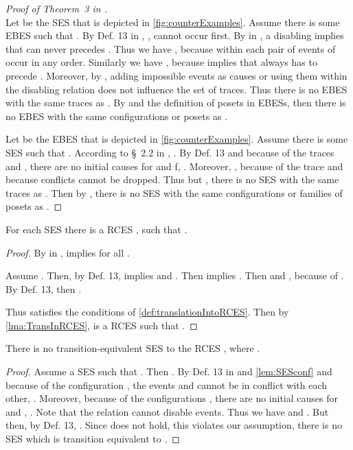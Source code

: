\documentclass[runningheads,a4paper]{llncs}
\begin{document}
\begin{proof}[Proof of Theorem~3 in \cite{dynamicCausality15}]
	\\
	Let  be the SES that is depicted in \fig\ref{fig:counterExamples}.
	Assume there is some EBES  such that .
	By Def. 13 in \cite{dynamicCausality15}, , \ie  cannot occur first.
	By  in \cite{dynamicCausality15}, a disabling  implies that  can never precedes .
	Thus we have , because within  each pair of events of  occur in any order.
	Similarly we have , because  implies that  always has to precede .
	Moreover, by , adding impossible events as causes
	or using them within the disabling relation does not influence the set of
	traces.
	Thus there is no EBES  with the same traces as . By
	 and the definition of posets in EBESs, then there is no EBES  with the same configurations or posets as .
	
	Let  be the EBES that is depicted in \fig\ref{fig:counterExamples}.
	Assume there is some SES  such that .
	According to \S~2.2 in \cite{dynamicCausality15}, .
	By Def. 13 and because of the traces  and , there are no initial causes for  and f, \ie .
	Moreover, , because of the trace  and because conflicts cannot be dropped.
	Thus  but , \ie
	there is no SES  with the same traces as . Then by
	, there is no SES  with the same configurations or families of posets as .
\end{proof}


\begin{lemma}\label{lma:SESinRCES}
	For each SES  there is a RCES , such that .
\end{lemma}

\begin{proof}
	By  in \cite{dynamicCausality15},  implies   for all .
	
	Assume .
	Then, by Def. 13,  implies  and .
	Then  implies . Then  and , because of .
	By Def. 13, then .
	
	Thus  satisfies the conditions of
	\ref{def:translationIntoRCES}. Then by \lem\ref{lma:TransInRCES},
	 is a RCES such that .
\end{proof}

\begin{lemma}
\label{lma:SESinRCESstrictly} 
	There is no transition-equivalent SES to the RCES , where .
\end{lemma}

\begin{proof}
	Assume a SES  such that . Then .
	By Def. 13 in \cite{dynamicCausality15} and \lem\ref{lem:SESconf} and because of
	the configuration , the
	events  and  cannot be in conflict with each other, \ie .
	Moreover, because of the configurations , there are no initial causes for  and , \ie .
	Note that the relation  cannot disable events.
	Thus we have  and .
	But then, by Def. 13, .
	Since  does not hold, this violates our
	assumption, \ie there is no SES which is transition equivalent to .
\end{proof}
\end{document}
